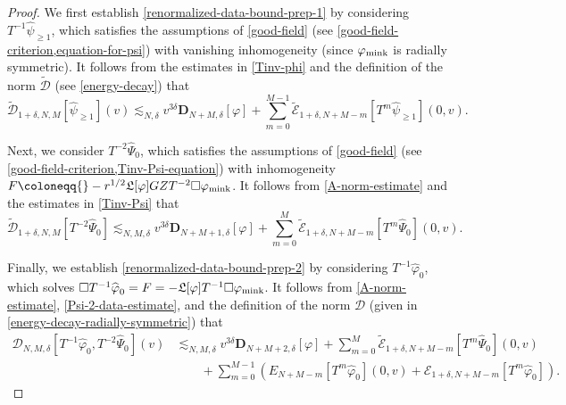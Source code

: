 \documentclass[10pt, reqno]{amsart}
\begin{document}
\begin{proof}
We first establish \cref{renormalized-data-bound-prep-1} by considering
\(T^{-1}\widehat{\psi{}}_{\ge 1}\), which satisfies the assumptions of
\cref{good-field} (see \cref{good-field-criterion,equation-for-psi}) with vanishing
inhomogeneity (since \(\varphi_{\textnormal{mink}}\) is radially symmetric). It
follows from the estimates in \cref{Tinv-phi} and the definition of the norm
\(\tilde{\mathcal{D}}\) (see \cref{energy-decay}) that
\begin{equation}
\tilde{\mathcal{D}}_{1+\delta{},N,M}[\widehat{\psi{}}_{\ge 1}](v) \lesssim_{N,\delta{}} v^{3\delta{}}\mathbf{D}_{N+M,\delta{}}{}[\varphi{}] +  \sum_{m=0}^{M-1} \tilde{\mathcal{E}}_{1+\delta{},N+M-m}[T^{m}\widehat{\psi{}}_{\ge 1}](0,v).
\end{equation}

Next, we consider \(T^{-2}\widehat{\Psi{}}_0\), which satisfies the assumptions of
\cref{good-field} (see \cref{good-field-criterion,Tinv-Psi-equation}) with
inhomogeneity
\(F\coloneqq{}-r^{1/2}\mathfrak{L}[\varphi{}]GZT^{-2}\Box{}\varphi{}_{\textnormal{mink}}\).
It follows from \cref{A-norm-estimate} and the estimates in \cref{Tinv-Psi} that
\begin{equation}\label{Psi-2-data-estimate}
\tilde{\mathcal{D}}_{1+\delta{},N,M}[T^{-2}\widehat{\Psi{}}_0]\lesssim_{N,M,\delta{}} v^{3\delta{}}\mathbf{D}_{N+M+1,\delta{}}{}[\varphi{}] + \sum_{m=0}^{M} \tilde{\mathcal{E}}_{1+\delta{},N+M-m}[T^{m}\widehat{\Psi{}}_0](0,v).
\end{equation}

Finally, we establish \cref{renormalized-data-bound-prep-2} by considering
\(T^{-1}\widehat{\varphi{}}_0\), which solves
\(\Box{}T^{-1}\widehat{\varphi{}}_0 = F =
-\mathfrak{L}[\varphi{}]T^{-1}\Box{}\varphi_{\textnormal{mink}}\). It follows
from \cref{A-norm-estimate}, \cref{Psi-2-data-estimate}, and the definition of the
norm \(\mathcal{D}\) (given in \cref{energy-decay-radially-symmetric}) that
\begin{equation}
\begin{split}
\mathcal{D}_{N,M,\delta{}}[T^{-1}\widehat{\varphi{}}_{0},T^{-2}\widehat{\Psi{}}_0](v)&\lesssim_{N,M,\delta{}} v^{3\delta{}}\mathbf{D}_{N+M+2,\delta{}}{}[\varphi{}] + \sum_{m=0}^{M} \tilde{\mathcal{E}}_{1+\delta{},N+M-m}[T^{m}\widehat{\Psi{}}_0](0,v) \\
&\qquad + \sum_{m=0}^{M-1}(E_{N+M-m}[T^m\widehat{\varphi{}}_0](0,v) + \mathcal{E}_{1+\delta{},N+M-m}[T^m\widehat{\varphi{}}_0]).
\end{split}
\end{equation}
\end{proof}
\end{document}
